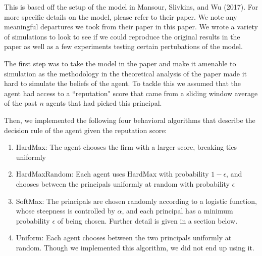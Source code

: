 \documentclass[11pt,letterpaper]{article}
\begin{document}
This is based off the setup of the model in Mansour, Slivkins, and Wu (2017). For more specific details on the model, please refer to their paper. We note any meaningful departures we took from their paper in this paper. We wrote a variety of simulations to look to see if we could reproduce the original results in the paper as well as a few experiments testing certain pertubations of the model.

The first step was to take the model in the paper and make it amenable to simulation as the methodology in the theoretical analysis of the paper made it hard to simulate the beliefs of the agent. To tackle this we assumed that the agent had access to a ``reputation" score that came from a sliding window average of the past $n$ agents that had picked this principal.

Then, we implemented the following four behavioral algorithms that describe the decision rule of the agent given the reputation score:
\begin{enumerate}
\item HardMax: The agent chooses the firm with a larger score, breaking ties uniformly
\item HardMaxRandom: Each agent uses HardMax with probability $1 - \epsilon$, and chooses between the principals uniformly at random with probability $\epsilon$
\item SoftMax: The principals are chosen randomly according to a logistic function, whose steepness is controlled by $\alpha$, and each principal has a minimum probability $\epsilon$ of being chosen. Further detail is given in a section below. 
\item Uniform: Each agent chooses between the two principals uniformly at random. Though we implemented this algorithm, we did not end up using it. 
\end{enumerate}
\end{document}
